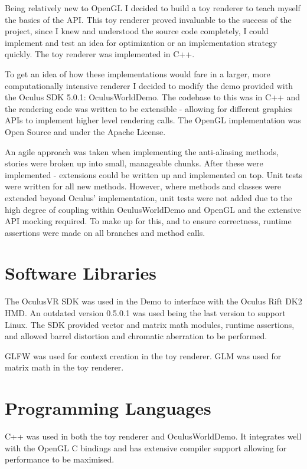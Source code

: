 \documentclass[12pt,a4paper,twoside,openright]{report}
\begin{document}
Being relatively new to OpenGL I decided to build a toy renderer to teach myself the basics of the API. This toy renderer proved invaluable to the success of the project, since I knew and understood the source code completely, I could implement and test an idea for optimization or an implementation strategy quickly. The toy renderer was implemented in C++.

To get an idea of how these implementations would fare in a larger, more computationally intensive renderer I decided to modify the demo provided with the Oculus SDK 5.0.1: OculusWorldDemo. The codebase to this was in C++ and the rendering code was written to be extensible - allowing for different graphics APIs to implement higher level rendering calls. The OpenGL implementation was Open Source and under the Apache License.

An agile approach was taken when implementing the anti-aliasing methods, stories were broken up into small, manageable chunks. After these were implemented - extensions could be written up and implemented on top. Unit tests were written for all new methods. However, where methods and classes were extended beyond Oculus' implementation, unit tests were not added due to the high degree of coupling within OculusWorldDemo and OpenGL and the extensive API mocking required. To make up for this, and to ensure correctness, runtime assertions were made on all branches and method calls.

\section{Software Libraries}

The OculusVR SDK was used in the Demo to interface with the Oculus Rift DK2 HMD. An outdated version 0.5.0.1 was used being the last version to support Linux.
The SDK provided vector and matrix math modules, runtime assertions, and allowed barrel distortion and chromatic aberration to be performed.

GLFW was used for context creation in the toy renderer.
GLM was used for matrix math in the toy renderer.

\section{Programming Languages}

C++ was used in both the toy renderer and OculusWorldDemo. It integrates well with the OpenGL C bindings and has extensive compiler support allowing for performance to be maximised.
\end{document}
